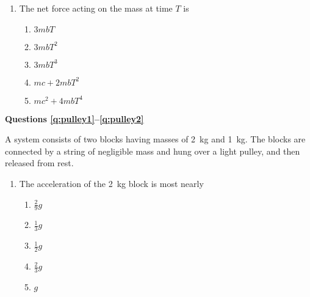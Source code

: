 \documentclass{../../../oss-classkick}
\begin{document}
\begin{multicols*}{2}
\begin{enumerate}[resume,leftmargin=18pt]
  \item The net force acting on the mass at time $T$ is
    \begin{enumerate}[nosep,leftmargin=18pt,label=(\Alph*)]
    \item $3mbT$
    \item $3mbT^2$
    \item $3mbT^3$
    \item $mc+2mbT^2$
    \item $mc^2+4mbT^4$
    \end{enumerate}
    \label{q:striaght2}
    \vspace{.7in}
  \end{enumerate}  
  \columnbreak
  
  \textbf{Questions \ref{q:pulley1}--\ref{q:pulley2}}

  A system consists of two blocks having masses of \SI{2}{\kilo\gram} and
  \SI{1}{\kilo\gram}. The blocks are connected by a string of negligible mass
  and hung over a light pulley, and then released from rest.
  \begin{center}
  \end{center}
  \begin{enumerate}[resume,leftmargin=18pt]
  \item The acceleration of the \SI{2}{\kilo\gram} block is most nearly
    \begin{enumerate}[nosep,leftmargin=18pt,label=(\Alph*)]
    \item $\displaystyle\frac{2}{9}g$
    \item $\displaystyle\frac{1}{3}g$
    \item $\displaystyle\frac{1}{2}g$
    \item $\displaystyle\frac{2}{3}g$
    \item $g$
    \end{enumerate}
    \label{q:pulley1}
    

\end{enumerate}
\end{multicols*}
\end{document}
